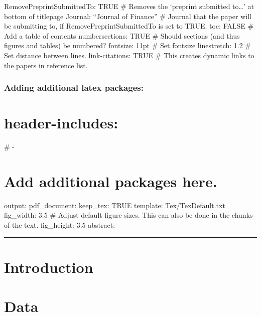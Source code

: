 \documentclass[preprint, authoryear]{article}
\numberwithin{equation}{section}
\numberwithin{figure}{section}
\numberwithin{table}{section}
\begin{document}
RemovePreprintSubmittedTo: TRUE \# Removes the `preprint submitted
to\ldots{}' at bottom of titlepage Journal: ``Journal of Finance'' \#
Journal that the paper will be submitting to, if
RemovePreprintSubmittedTo is set to TRUE. toc: FALSE \# Add a table of
contents numbersections: TRUE \# Should sections (and thus figures and
tables) be numbered? fontsize: 11pt \# Set fontsize linestretch: 1.2 \#
Set distance between lines. link-citations: TRUE \# This creates dynamic
links to the papers in reference list.

\hypertarget{adding-additional-latex-packages}{%
\subsubsection{Adding additional latex
packages:}\label{adding-additional-latex-packages}}

\hypertarget{header-includes}{%
\section{header-includes:}\label{header-includes}}

\# -

\usepackage{colortbl}

\hypertarget{add-additional-packages-here.}{%
\section{Add additional packages
here.}\label{add-additional-packages-here.}}

output: pdf\_document: keep\_tex: TRUE template: Tex/TexDefault.txt
fig\_width: 3.5 \# Adjust default figure sizes. This can also be done in
the chunks of the text. fig\_height: 3.5 abstract: \textbar{}

\begin{center}\rule{0.5\linewidth}{0.5pt}\end{center}

\hypertarget{introduction}{%
\section{\texorpdfstring{Introduction
\label{Introduction}}{Introduction }}\label{introduction}}

\hypertarget{data}{%
\section*{Data}\label{data}}
\end{document}
